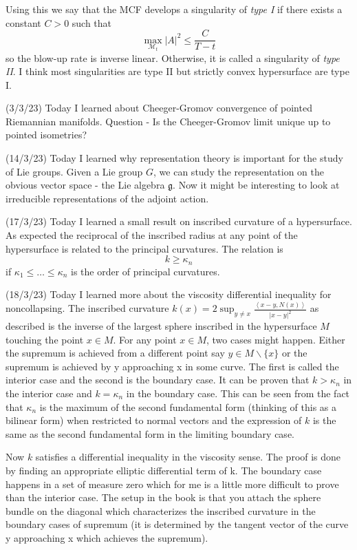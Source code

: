 \documentclass[12pt,a4paper]{article}
\begin{document}
Using this we say that the MCF develops a singularity of \textit{type I} if there exists a constant $ C>0 $ such that 
\[ \max_{ \mathcal{M}_{t}}|A|^{2} \le \frac{C}{T-t} \]
so the blow-up rate is inverse linear. Otherwise, it is called a singularity of \textit{type II}. I think most singularities are type II but strictly convex hypersurface are type I. 

(3/3/23) Today I learned about Cheeger-Gromov convergence of pointed Riemannian manifolds. Question - Is the Cheeger-Gromov limit unique up to pointed isometries?

(14/3/23) Today I learned why representation theory is important for the study of Lie groups. Given a Lie group $ G $, we can study the representation on the obvious vector space - the Lie algebra $ \mathfrak{g} $. Now it might be interesting to look at irreducible representations of the adjoint action. 

(17/3/23) Today I learned a small result on inscribed curvature of a hypersurface. As expected the reciprocal of the inscribed radius at any point of the hypersurface is related to the principal curvatures. The relation is 
\[ k \ge \kappa_{n} \]
if $ \kappa_{1} \le \ldots \le \kappa_{n} $ is the order of principal curvatures. %

(18/3/23) Today I learned more about the viscosity differential inequality for noncollapsing. The inscribed curvature $k(x) = 2 \sup_{y \neq x} \frac{\left<x-y, N(x)\right>}{|x-y|^2}$ as described is the inverse of the largest sphere inscribed in the hypersurface $M$ touching the point $x \in M$. For any point $x \in M$, two cases might happen. Either the supremum is achieved from a different point say $y \in M\backslash \{x\}$ or the supremum is achieved by y approaching x in some curve. The first is called the interior case and the second is the boundary case. It can be proven that $k >\kappa_n$ in the interior case and $k = \kappa_n$ in the boundary case. This can be seen from the fact that $\kappa_n$ is the maximum of the second fundamental form (thinking of this as a bilinear form) when restricted to normal vectors and the expression of $k$ is the same as the second fundamental form in the limiting boundary case. 

Now $k$ satisfies a differential inequality in the viscosity sense. The proof is done by finding an appropriate elliptic differential term of k. The boundary case happens in a set of measure zero which for me is a little more difficult to prove than the interior case. The setup in the book is that you attach the sphere bundle on the diagonal which characterizes the inscribed curvature in the boundary cases of supremum (it is determined by the tangent vector of the curve y approaching x which achieves the supremum). 
\end{document}

